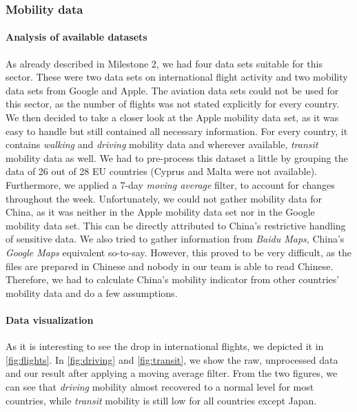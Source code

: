 \subsubsection{Mobility data}

\paragraph{Analysis of available datasets}

As already described in Milestone 2, we had four data sets suitable for this sector. These were two data sets on international flight activity and two mobility data sets from Google and Apple. The aviation data sets could not be used for this sector, as the number of flights was not stated explicitly for every country. We then decided to take a closer look at the Apple mobility data set, as it was easy to handle but still contained all necessary information. For every country, it contains \textit{walking} and \textit{driving} mobility data and wherever available, \textit{transit} mobility data as well. We had to pre-process this dataset a little by grouping the data of 26 out of 28 EU countries (Cyprus and Malta were not available). Furthermore, we applied a 7-day \textit{moving average} filter, to account for changes throughout the week. Unfortunately, we could not gather mobility data for China, as it was neither in the Apple mobility data set nor in the Google mobility data set. This can be directly attributed to China's restrictive handling of sensitive data. We also tried to gather information from \textit{Baidu Maps}, China's \textit{Google Maps} equivalent so-to-say. However, this proved to be very difficult, as the files are prepared in Chinese and nobody in our team is able to read Chinese. Therefore, we had to calculate China's mobility indicator from other countries' mobility data and do a few assumptions.

\paragraph{Data visualization}

As it is interesting to see the drop in international flights, we depicted it in \autoref{fig:flights}. In \autoref{fig:driving} and \ref{fig:transit}, we show the raw, unprocessed data and our result after applying a moving average filter. From the two figures, we can see that \textit{driving} mobility almost recovered to a normal level for most countries, while \textit{transit} mobility is still low for all countries except Japan.


